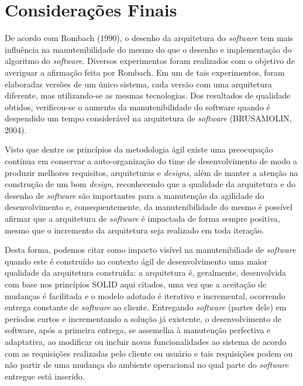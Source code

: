 \chapter[Considerações Finais]{Considerações Finais}

De acordo com Rombach (1990), o desenho da arquitetura do \textit{software} tem mais influência na manutenibilidade do mesmo do que o desenho e implementação do algoritmo do \textit{software}.
Diversos experimentos foram realizados com o objetivo de averiguar a afirmação feita por Rombach. Em um de tais experimentos, foram elaboradas versões de um único sistema, cada versão com uma arquitetura diferente, mas utilizando-se as mesmas tecnologias. Dos resultados de qualidade obtidos, verificou-se o aumento da manutenibilidade do software quando é despendido um tempo considerável na arquitetura de \textit{software} (BRUSAMOLIN, 2004).

Visto que dentre os princípios da metodologia ágil existe uma preocupação contínua em conservar a auto-organização do time de desenvolvimento de modo a produzir melhores requisitos, arquiteturas e \textit{designs}, além de manter a atenção na construção de um bom \textit{design}, reconhecendo que a qualidade da arquitetura e do desenho de \textit{software} são importantes para a manutenção da agilidade do desenvolvimento e, consequentemente, da manutenibilidade do mesmo é possível afirmar que a arquitetura de \textit{software} é impactada de forma sempre positiva, mesmo que o incremento da arquitetura seja realizado em toda iteração.

Desta forma, podemos citar como impacto visível na manutenibiliade de \textit{software} quando este é construído no contexto ágil de desenvolvimento uma maior qualidade da arquitetura construída: a arquitetura é, geralmente, desenvolvida com base nos princípios SOLID aqui citados, uma vez que a aceitação de mudanças é facilitada e o modelo adotado é iterativo e incremental, ocorrendo entrega constante de \textit{software} ao cliente. Entregando \textit{software} (partes dele) em períodos curtos e incrementando a solução já existente, o desenvolvimento de software, após a primeira entrega, se assemelha à manutenção perfectiva e adaptativa, ao modificar ou incluir novas funcionalidades ao sistema de acordo com as requisições realizadas pelo cliente ou usuário e tais requisições podem ou não partir de uma mudança do ambiente operacional no qual parte do \textit{software} entregue está inserido.
